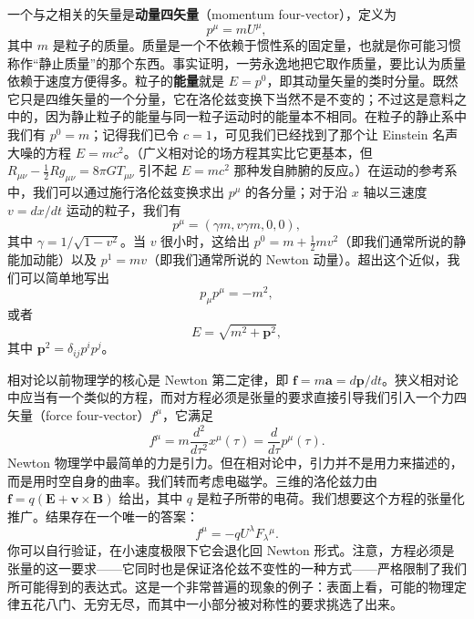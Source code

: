 一个与之相关的矢量是\textbf{动量四矢量}（momentum four-vector），定义为
\begin{equation*}
\boxed{p^{\mu} = mU^{\mu},}
\tag{1.101}
\end{equation*}
其中 $m$ 是粒子的质量。质量是一个不依赖于惯性系的固定量，也就是你可能习惯称作“静止质量”的那个东西。事实证明，一劳永逸地把它取作质量，要比认为质量依赖于速度方便得多。粒子的\textbf{能量}就是 $E=p^{0}$，即其动量矢量的类时分量。既然它只是四维矢量的一个分量，它在洛伦兹变换下当然不是不变的；不过这是意料之中的，因为静止粒子的能量与同一粒子运动时的能量本不相同。在粒子的静止系中我们有 $p^{0}=m$；记得我们已令 $c=1$，可见我们已经找到了那个让 Einstein 名声大噪的方程 $E=mc^{2}$。（广义相对论的场方程其实比它更基本，但 $R_{\mu\nu}-\frac{1}{2}Rg_{\mu\nu}=8\pi GT_{\mu\nu}$ 引不起 $E=mc^{2}$ 那种发自肺腑的反应。）在运动的参考系中，我们可以通过施行洛伦兹变换求出 $p^{\mu}$ 的各分量；对于沿 $x$ 轴以三速度 $v=dx/dt$ 运动的粒子，我们有
\begin{equation*}
p^{\mu} = (\gamma m, v\gamma m, 0, 0),
\tag{1.102}
\end{equation*}
其中 $\gamma=1/\sqrt{1-v^{2}}$。当 $v$ 很小时，这给出 $p^{0}=m+\frac{1}{2}mv^{2}$（即我们通常所说的静能加动能）以及 $p^{1}=mv$（即我们通常所说的 Newton 动量）。超出这个近似，我们可以简单地写出
\begin{equation*}
p_{\mu}p^{\mu} = -m^{2},
\tag{1.103}
\end{equation*}
或者
\begin{equation*}
E = \sqrt{m^{2} + \mathbf{p}^{2}},
\tag{1.104}
\end{equation*}
其中 $\mathbf{p}^{2}=\delta_{ij}p^{i}p^{j}$。

相对论以前物理学的核心是 Newton 第二定律，即 $\mathbf{f}=m\mathbf{a}=d\mathbf{p}/dt$。狭义相对论中应当有一个类似的方程，而对方程必须是张量的要求直接引导我们引入一个力四矢量（force four-vector）$f^{\mu}$，它满足
\begin{equation*}
f^{\mu} = m\frac{d^{2}}{d\tau^{2}}x^{\mu}(\tau) = \frac{d}{d\tau}p^{\mu}(\tau).
\tag{1.105}
\end{equation*}
Newton 物理学中最简单的力是引力。但在相对论中，引力并不是用力来描述的，而是用时空自身的曲率。我们转而考虑电磁学。三维的洛伦兹力由 $\mathbf{f}=q(\mathbf{E}+\mathbf{v}\times\mathbf{B})$ 给出，其中 $q$ 是粒子所带的电荷。我们想要这个方程的张量化推广。结果存在一个唯一的答案：
\begin{equation*}
f^{\mu} = -qU^{\lambda}F_{\lambda}{}^{\mu}.
\tag{1.106}
\end{equation*}
你可以自行验证，在小速度极限下它会退化回 Newton 形式。注意，方程必须是张量的这一要求——它同时也是保证洛伦兹不变性的一种方式——严格限制了我们所可能得到的表达式。这是一个非常普遍的现象的例子：表面上看，可能的物理定律五花八门、无穷无尽，而其中一小部分被对称性的要求挑选了出来。

